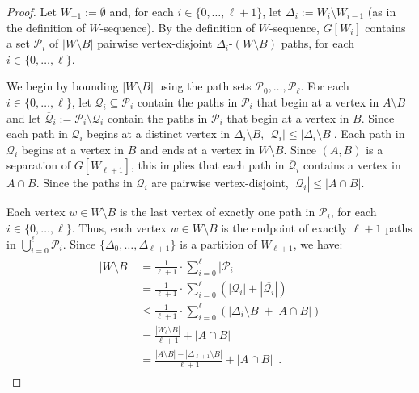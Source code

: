 \documentclass{patmorin}
\newcommand{\hussein}[1]{\textcolor{purple}{HH: #1}}
\begin{document}
\begin{proof}
  Let $W_{-1}:=\emptyset$ and, for each $i\in\{0,\ldots,\ell+1\}$, let $\Delta_{i}:=W_{i}\setminus W_{i-1}$ (as in the definition of $W$-sequence).
  By the definition of $W$-sequence, $G[W_{i}]$ contains a set $\mathcal{P}_i$ of $|W\setminus B|$ pairwise vertex-disjoint $\Delta_i$-$(W\setminus B)$ paths, for each $i\in\{0,\ldots,\ell\}$.  
  
  We begin by bounding $|W\setminus B|$ using the path sets $\mathcal{P}_0,\ldots,\mathcal{P}_{\ell}$.  For each $i\in\{0,\ldots,\ell\}$, let $\mathcal{Q}_i\subseteq \mathcal{P}_i$ contain the paths in $\mathcal{P}_i$ that begin at a vertex in $A\setminus B$ and let $\overline{\mathcal{Q}}_i:=\mathcal{P}_i\setminus \mathcal{Q}_i$ contain the paths in $\mathcal{P}_i$ that begin at a vertex in $B$.  Since each path in $\mathcal{Q}_i$ begins at a distinct vertex in $\Delta_i\setminus B$, $|\mathcal{Q}_i|\le|\Delta_i\setminus B|$. Each path in $\overline{\mathcal{Q}}_i$ begins at a vertex in $B$ and ends at a vertex in $W\setminus B$. Since $(A,B)$ is a separation of $G[W_{\ell+1}]$, this implies that each path in $\overline{\mathcal{Q}}_i$ contains a vertex in $A\cap B$.  Since the paths in $\overline{\mathcal{Q}}_i$ are pairwise vertex-disjoint, $|\overline{\mathcal{Q}}_i|\le |A\cap B|$.
  
  Each vertex $w\in W\setminus B$ is the last vertex of exactly one path in $\mathcal{P}_i$, for each $i\in\{0,\ldots,\ell\}$. Thus, each vertex $w\in W\setminus B$ is the endpoint of exactly $\ell+1$ paths in $\bigcup_{i=0}^\ell\mathcal{P}_i$.  Since $\{\Delta_0,\ldots,\Delta_{\ell+1}\}$ is a partition of $W_{\ell+1}$, we have:
  \begin{align}
  \begin{split}
    |W\setminus B| 
      & = \frac{1}{\ell+1}\cdot\sum_{i=0}^{\ell}|\mathcal{P}_i| \\
      & = \frac{1}{\ell+1}\cdot\sum_{i=0}^{\ell}\left(|\mathcal{Q}_i|+|\overline{\mathcal{Q}_i}|\right) \\
      & \le \frac{1}{\ell+1}\cdot\sum_{i=0}^{\ell}\left(|\Delta_i\setminus B|+|A\cap B|\right) \\
      & = \frac{|W_\ell\setminus B|}{\ell+1} + |A\cap B| \\
      & = \frac{|A\setminus B|-|\Delta_{\ell+1}\setminus B|}{\ell+1} + |A\cap B| \enspace .  \label{w_b_bound}
  \end{split}
  \end{align}


\end{proof}
\end{document}
